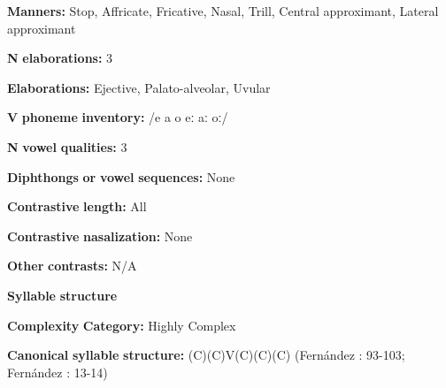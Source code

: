 \documentclass[output=paper]{langsci/langscibook}
\begin{document}
\begin{styleBody}
\textbf{Manners:} Stop, Affricate, Fricative, Nasal, Trill, Central approximant, Lateral approximant
\end{styleBody}

\begin{styleBody}
\textbf{N} \textbf{elaborations:} 3
\end{styleBody}

\begin{styleBody}
\textbf{Elaborations:} Ejective, Palato-alveolar, Uvular
\end{styleBody}

\begin{styleBody}
\textbf{V} \textbf{phoneme} \textbf{inventory:} /e a o eː aː oː/
\end{styleBody}

\begin{styleBody}
\textbf{N} \textbf{vowel} \textbf{qualities:} 3
\end{styleBody}

\begin{styleBody}
\textbf{Diphthongs} \textbf{or} \textbf{vowel} \textbf{sequences:} None
\end{styleBody}

\begin{styleBody}
\textbf{Contrastive} \textbf{length:} All
\end{styleBody}

\begin{styleBody}
\textbf{Contrastive} \textbf{nasalization:} None
\end{styleBody}

\begin{styleBody}
\textbf{Other} \textbf{contrasts:} N/A
\end{styleBody}

\begin{styleBody}
\textbf{Syllable} \textbf{structure}
\end{styleBody}

\begin{styleBody}
\textbf{Complexity} \textbf{Category:} Highly Complex
\end{styleBody}

\begin{styleBody}
\textbf{Canonical} \textbf{syllable} \textbf{structure:} (C)(C)V(C)(C)(C) (Fernández \citealt{Garay1998}: 93-103; Fernández \citealt{GarayHernández2006}: 13-14)
\end{styleBody}
\end{document}
